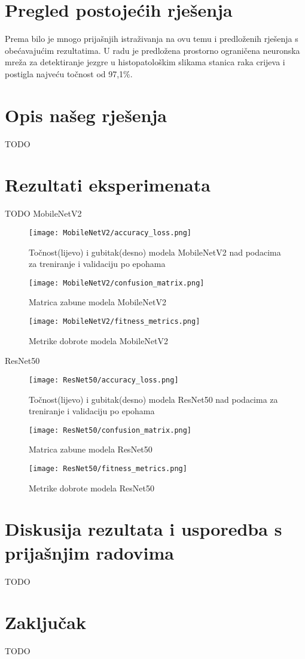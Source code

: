 \documentclass[conference, utf8]{IEEEtran}
\begin{document}
\pagebreak[1]

\section{Pregled postojećih rješenja}
Prema \cite{mehmood2022malignancy} bilo je mnogo prijašnjih istraživanja na ovu temu i predloženih rješenja s obećavajućim rezultatima. U radu \cite{Sirinukunwattana} je predložena prostorno ograničena neuronska mreža za detektiranje jezgre u histopatološkim slikama stanica raka crijeva i postigla najveću točnost od 97,1\%.

\pagebreak[3]

\section{Opis našeg rješenja}
TODO

\pagebreak

\section{Rezultati eksperimenata}
TODO
MobileNetV2
\begin{figure}[ht]
  \centering
  \texttt{[image: MobileNetV2/accuracy\_loss.png]}
  \caption{Točnost(lijevo) i gubitak(desno) modela MobileNetV2 nad podacima za treniranje i validaciju po epohama}
  \label{fig:MN_acc_loss}
\end{figure}
\begin{figure}[ht]
  \centering
  \texttt{[image: MobileNetV2/confusion\_matrix.png]}
  \caption{Matrica zabune modela MobileNetV2}
  \label{fig:MN_conf_mat}
\end{figure}
\begin{figure}[ht]
  \centering
  \texttt{[image: MobileNetV2/fitness\_metrics.png]}
  \caption{Metrike dobrote modela MobileNetV2}
  \label{fig:MN_fit_met}
\end{figure}

ResNet50
\begin{figure}[ht]
  \centering
  \texttt{[image: ResNet50/accuracy\_loss.png]}
  \caption{Točnost(lijevo) i gubitak(desno) modela ResNet50 nad podacima za treniranje i validaciju po epohama}
  \label{fig:RN50_acc_loss}
\end{figure}
\begin{figure}[ht]
  \centering
  \texttt{[image: ResNet50/confusion\_matrix.png]}
  \caption{Matrica zabune modela ResNet50}
  \label{fig:RN50_conf_mat}
\end{figure}
\begin{figure}[ht]
  \centering
  \texttt{[image: ResNet50/fitness\_metrics.png]}
  \caption{Metrike dobrote modela ResNet50}
  \label{fig:RN50_fit_met}
\end{figure}

\pagebreak

\section{Diskusija rezultata i usporedba s prijašnjim radovima}
TODO

\pagebreak

\section{Zaključak}
TODO



\end{document}
